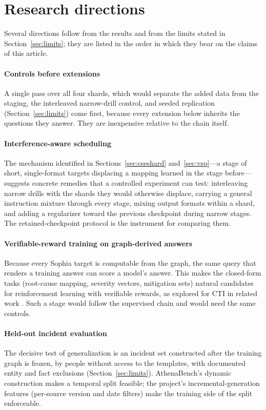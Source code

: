 \documentclass[a4paper,fleqn]{cas-dc}
\begin{document}
\section{Research directions}\label{sec:directions}
Several directions follow from the results and from the limits stated in Section~\ref{sec:limits}; they are listed in the order in which they bear on the claims of this article.

\paragraph{Controls before extensions}
A single pass over all four shards, which would separate the added data from the staging, the interleaved narrow-drill control, and seeded replication (Section~\ref{sec:limits}) come first, because every extension below inherits the questions they answer. They are inexpensive relative to the chain itself.

\paragraph{Interference-aware scheduling}
The mechanism identified in Sections~\ref{sec:cseshard} and~\ref{sec:vsp}---a stage of short, single-format targets displacing a mapping learned in the stage before---suggests concrete remedies that a controlled experiment can test: interleaving narrow drills with the shards they would otherwise displace, carrying a general instruction mixture through every stage, mixing output formats within a shard, and adding a regularizer toward the previous checkpoint during narrow stages. The retained-checkpoint protocol is the instrument for comparing them.

\paragraph{Verifiable-reward training on graph-derived answers}
Because every Sophia target is computable from the graph, the same query that renders a training answer can score a model's answer. This makes the closed-form tasks (root-cause mapping, severity vectors, mitigation sets) natural candidates for reinforcement learning with verifiable rewards, as explored for CTI in related work \citep{alam2026minerva}. Such a stage would follow the supervised chain and would need the same controls.

\paragraph{Held-out incident evaluation}
The decisive test of generalization is an incident set constructed after the training graph is frozen, by people without access to the templates, with documented entity and fact exclusions (Section~\ref{sec:limits}). AthenaBench's dynamic construction makes a temporal split feasible; the project's incremental-generation features (per-source version and date filters) make the training side of the split enforceable.
\end{document}
